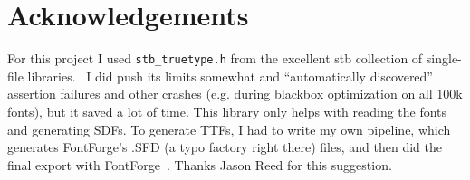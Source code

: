 \documentclass[twocolumn]{article}
\begin{document}


\section{Acknowledgements}

For this project I used \verb+stb_truetype.h+ from the excellent stb
collection of single-file libraries.~\cite{stb} I did push its limits
somewhat and ``automatically discovered'' assertion failures and other
crashes (e.g. during blackbox optimization on all 100k fonts), but it
saved a lot of time. This library only helps with reading the fonts
and generating SDFs. To generate TTFs, I had to write my own pipeline,
which generates FontForge's .SFD (a typo factory right there) files,
and then did the final export with FontForge~\cite{fontforge}. Thanks
Jason Reed for this suggestion.


\nocite{murphy2019blind}
\nocite{murphy2019eloworld}
\nocite{stb}

{}

\end{document}
